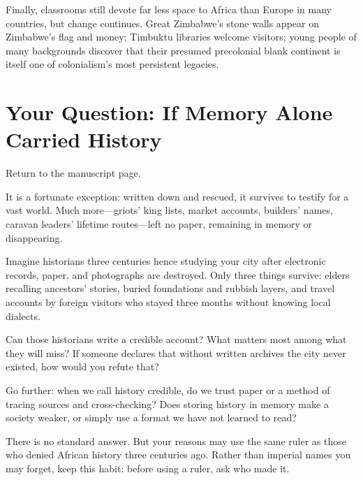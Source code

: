 Finally, classrooms still devote far less space to Africa than Europe in many countries, but change continues. Great Zimbabwe's stone walls appear on Zimbabwe's flag and money; Timbuktu libraries welcome visitors; young people of many backgrounds discover that their presumed precolonial blank continent is itself one of colonialism's most persistent legacies.

\section[History Carried by Memory Alone]{Your Question: If Memory Alone Carried History}
Return to the manuscript page.

It is a fortunate exception: written down and rescued, it survives to testify for a vast world. Much more---griots' king lists, market accounts, builders' names, caravan leaders' lifetime routes---left no paper, remaining in memory or disappearing.

Imagine historians three centuries hence studying your city after electronic records, paper, and photographs are destroyed. Only three things survive: elders recalling ancestors' stories, buried foundations and rubbish layers, and travel accounts by foreign visitors who stayed three months without knowing local dialects.

Can those historians write a credible account? What matters most among what they will miss? If someone declares that without written archives the city never existed, how would you refute that?

Go further: when we call history credible, do we trust paper or a method of tracing sources and cross-checking? Does storing history in memory make a society weaker, or simply use a format we have not learned to read?

There is no standard answer. But your reasons may use the same ruler as those who denied African history three centuries ago. Rather than imperial names you may forget, keep this habit: before using a ruler, ask who made it.

